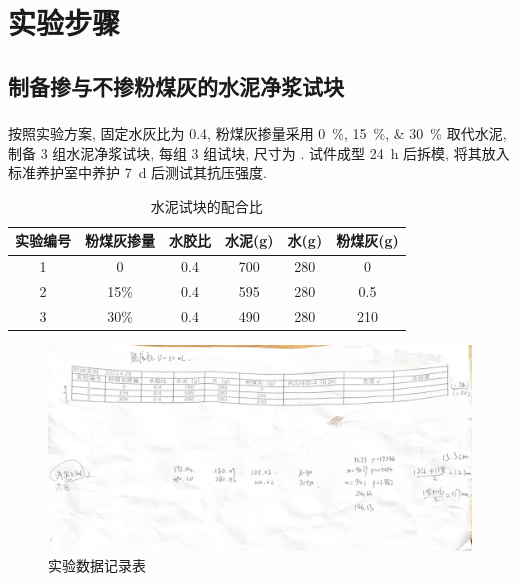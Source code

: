 
\section{实验步骤}

\subsection{制备掺与不掺粉煤灰的水泥净浆试块}

\subsubsection{}
按照实验方案, 固定水灰比为 \num{0.4}, 粉煤灰掺量采用 \qtylist{0; 15; 30}{\percent} 取代水泥, 制备 3 组水泥净浆试块, 每组 3 组试块, 尺寸为 .
试件成型 \SI{24}{\hour} 后拆模, 将其放入标准养护室中养护 \SI{7}{\day} 后测试其抗压强度.
\begin{table}[!t]
    \centering
    \caption{水泥试块的配合比}
    \begin{tabular}{|c|c|c|c|c|c|}
    \hline
    实验编号 & 粉煤灰掺量 & 水胶比 & 水泥(g) & 水(g) & 粉煤灰(g) \\ \hline
    1    & 0      & 0.4 & 700   & 280  & 0      \\ \hline
    2    & 15\%   & 0.4 & 595   & 280  & 0.5    \\ \hline
    3    & 30\%   & 0.4 & 490   & 280  & 210    \\ \hline
    \end{tabular}
\end{table}
\begin{figure}
    \centering
    \caption{实验数据记录表}
    \includegraphics[width = 0.7 \linewidth]{figures/exp1/record table.png}
\end{figure}

